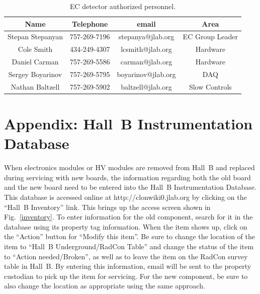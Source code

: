 \documentclass[letterpaper,10pt]{article}
\begin{document}
\begin{table}[htbp]
\begin{center}
\begin{tabular} {|c|c|c|c|} \hline
Name             & Telephone    & email              & Area             \\ \hline \hline
Stepan Stepanyan & 757-269-7196 & stepanya@jlab.org  & EC Group Leader  \\ \hline
Cole Smith       & 434-249-4307 & lcsmith@jlab.org   & Hardware         \\ \hline
Daniel Carman    & 757-269-5586 & carman@jlab.org    & Hardware         \\ \hline
Sergey Boyarinov & 757-269-5795 & boyarinov@jlab.org & DAQ              \\ \hline
Nathan Baltzell  & 757-269-5902 & baltzell@jlab.org  & Slow Controls    \\ \hline
\end{tabular}
\caption{EC detector authorized personnel.}
\label{expert-list}
\end{center}
\end{table}

\clearpage

\vfil
\eject

\section{Appendix: Hall~B Instrumentation Database}

When electronics modules or HV modules are removed from Hall~B and replaced during servicing with
new boards, the information regarding both the old board and the new board need to be entered into
the Hall~B Instrumentation Database. This database is accessed online at http://clonwiki0.jlab.org
by clicking on the ``Hall~B Inventory'' link. This brings up the access screen shown in 
Fig.~\ref{inventory}. To enter information for the old component, search for it in the database using
its property tag information. When the item shows up, click on the ``Action'' button for
``Modify this item''. Be sure to change the location of the item to ``Hall~B Underground/RadCon Table''
and change the status of the item to ``Action needed/Broken'', as well as to leave the item on the
RadCon survey table in Hall~B. By entering this information, email will be sent to the property custodian
to pick up the item for servicing. For the new component, be sure to also change the location as
appropriate using the same approach.
\end{document}
